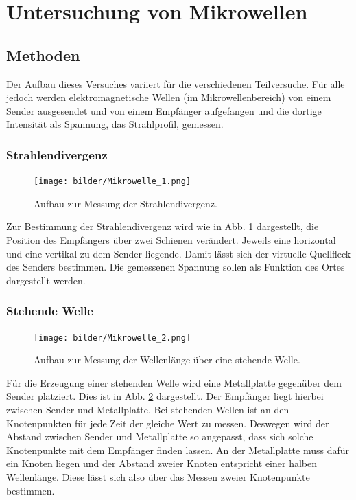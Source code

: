 \section{Untersuchung von Mikrowellen}

	\subsection{Methoden} \label{Methoden}
		
		Der Aufbau dieses Versuches variiert für die verschiedenen Teilversuche.
		Für alle jedoch werden elektromagnetische Wellen (im Mikrowellenbereich) von einem Sender ausgesendet und von einem Empfänger aufgefangen und die dortige Intensität als Spannung, das Strahlprofil, gemessen.
		
		\subsubsection*{Strahlendivergenz}
		\begin{figure}[ht]
			\centering
			\texttt{[image: bilder/Mikrowelle\_1.png]}
			\caption{Aufbau zur Messung der Strahlendivergenz.\cite{WWU}}
			\label{fig:Aufbau1}	
		\end{figure}
	
		Zur Bestimmung der Strahlendivergenz wird wie in Abb. \ref{fig:Aufbau1} dargestellt, die Position des Empfängers über zwei Schienen verändert. 
		Jeweils eine horizontal und eine vertikal zu dem Sender liegende. 
		Damit lässt sich der virtuelle Quellfleck des Senders bestimmen.
		Die gemessenen Spannung sollen als Funktion des Ortes dargestellt werden. 
		
		\subsubsection*{Stehende Welle}
		\begin{figure}[ht]
			\centering
			\texttt{[image: bilder/Mikrowelle\_2.png]}
			\caption{Aufbau zur Messung der Wellenlänge über eine stehende Welle.\cite{WWU}}
			\label{fig:Aufbau2}	
		\end{figure}
		Für die Erzeugung einer stehenden Welle wird eine Metallplatte gegenüber dem Sender platziert. 
		Dies ist in Abb. \ref{fig:Aufbau2} dargestellt.
		Der Empfänger liegt hierbei zwischen Sender und Metallplatte. 
		Bei stehenden Wellen ist an den Knotenpunkten für jede Zeit der gleiche Wert zu messen.
		Deswegen wird der Abstand zwischen Sender und Metallplatte so angepasst, dass sich solche Knotenpunkte mit dem Empfänger finden lassen.
		An der Metallplatte muss dafür ein Knoten liegen und der Abstand zweier Knoten entspricht einer halben Wellenlänge.
		Diese lässt sich also über das Messen zweier Knotenpunkte bestimmen.
		
